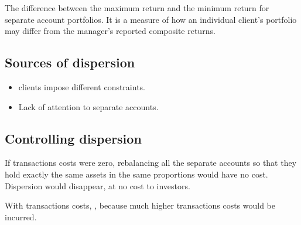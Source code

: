 \begin{imdefbox}[title={Dispersion}]
The difference between the maximum return and the minimum return for separate
account portfolios. It is a measure of how an individual client's portfolio may
differ from the manager's reported composite returns.
\end{imdefbox}

\subsection{Sources of dispersion}

\begin{itemize}
\item {} clients impose different constraints.
\item Lack of attention to separate accounts.
\end{itemize}

\subsection{Controlling dispersion}

If transactions costs were zero, rebalancing all the separate accounts so that
they hold exactly the same assets in the same proportions would have no cost.
Dispersion would disappear, at no cost to investors.

With transactions costs, , because much
higher transactions costs would be incurred.

